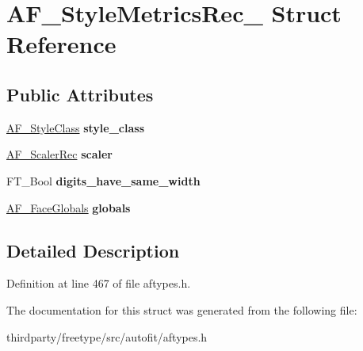 \hypertarget{struct_a_f___style_metrics_rec__}{}\section{A\+F\+\_\+\+Style\+Metrics\+Rec\+\_\+ Struct Reference}
\label{struct_a_f___style_metrics_rec__}
\subsection*{Public Attributes}
\begin{DoxyCompactItemize}
\item 
\mbox{\label{struct_a_f___style_metrics_rec___a2e58dd2c1391969f5ff0f67df9b3aecd}} 
\hyperlink{struct_a_f___style_class_rec__}{A\+F\+\_\+\+Style\+Class} {\bfseries style\+\_\+class}
\item 
\mbox{\label{struct_a_f___style_metrics_rec___a05ba109af541c5a170d8684a2dc50673}} 
\hyperlink{struct_a_f___scaler_rec__}{A\+F\+\_\+\+Scaler\+Rec} {\bfseries scaler}
\item 
\mbox{\label{struct_a_f___style_metrics_rec___a1bda72600a46e3a2db54a847752cf25f}} 
F\+T\+\_\+\+Bool {\bfseries digits\+\_\+have\+\_\+same\+\_\+width}
\item 
\mbox{\label{struct_a_f___style_metrics_rec___a64be35a74a0be98fa31cc150a97a140f}} 
\hyperlink{struct_a_f___face_globals_rec__}{A\+F\+\_\+\+Face\+Globals} {\bfseries globals}
\end{DoxyCompactItemize}


\subsection{Detailed Description}


Definition at line 467 of file aftypes.\+h.



The documentation for this struct was generated from the following file\+:\begin{DoxyCompactItemize}
\item 
thirdparty/freetype/src/autofit/aftypes.\+h\end{DoxyCompactItemize}
